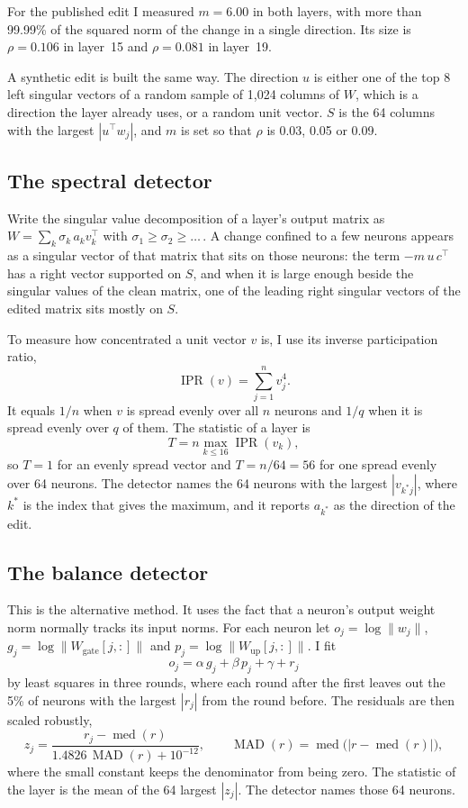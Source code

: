 \documentclass[11pt,a4paper]{article}
\DeclareMathOperator{\IPR}{IPR}
\DeclareMathOperator{\med}{med}
\DeclareMathOperator{\MAD}{MAD}
\newcommand{\norm}[1]{\lVert #1 \rVert}
\begin{document}
For the published edit I measured $m = 6.00$ in both layers, with more than 99.99\% of the squared
norm of the change in a single direction. Its size is $\rho = 0.106$ in layer~15 and
$\rho = 0.081$ in layer~19.

A synthetic edit is built the same way. The direction $u$ is either one of the top 8 left singular
vectors of a random sample of 1{,}024 columns of $W$, which is a direction the layer already uses,
or a random unit vector. $S$ is the 64 columns with the largest $|u^\top w_j|$, and $m$ is set so
that $\rho$ is 0.03, 0.05 or 0.09.

\subsection{The spectral detector}

Write the singular value decomposition of a layer's output matrix as
$W = \sum_k \sigma_k\, a_k v_k^\top$ with $\sigma_1 \ge \sigma_2 \ge \dots$\,. A change confined to
a few neurons appears as a singular vector of that matrix that sits on those neurons: the term
$-m\,u\,c^\top$ has a right vector supported on $S$, and when it is large enough beside the
singular values of the clean matrix, one of the leading right singular vectors of the edited
matrix sits mostly on $S$.

To measure how concentrated a unit vector $v$ is, I use its inverse participation ratio,
\[
  \IPR(v) = \sum_{j=1}^{n} v_j^{4} .
\]
It equals $1/n$ when $v$ is spread evenly over all $n$ neurons and $1/q$ when it is spread evenly
over $q$ of them. The statistic of a layer is
\[
  T = n \max_{k \le 16} \IPR(v_k) ,
\]
so $T = 1$ for an evenly spread vector and $T = n/64 = 56$ for one spread evenly over 64 neurons.
The detector names the 64 neurons with the largest $|v_{k^\ast j}|$, where $k^\ast$ is the index
that gives the maximum, and it reports $a_{k^\ast}$ as the direction of the edit.

\subsection{The balance detector}

This is the alternative method. It uses the fact that a neuron's output weight norm normally
tracks its input norms. For each neuron let
$o_j = \log \norm{w_j}$, $g_j = \log \norm{W_{\mathrm{gate}}[j,:]}$ and
$p_j = \log \norm{W_{\mathrm{up}}[j,:]}$. I fit
\[
  o_j = \alpha\, g_j + \beta\, p_j + \gamma + r_j
\]
by least squares in three rounds, where each round after the first leaves out the 5\% of neurons
with the largest $|r_j|$ from the round before. The residuals are then scaled robustly,
\[
  z_j = \frac{r_j - \med(r)}{1.4826\,\MAD(r) + 10^{-12}} ,
  \qquad \MAD(r) = \med\bigl(|r - \med(r)|\bigr) ,
\]
where the small constant keeps the denominator from being zero. The statistic of the layer is
the mean of the 64 largest $|z_j|$. The detector names those 64
neurons.
\end{document}
